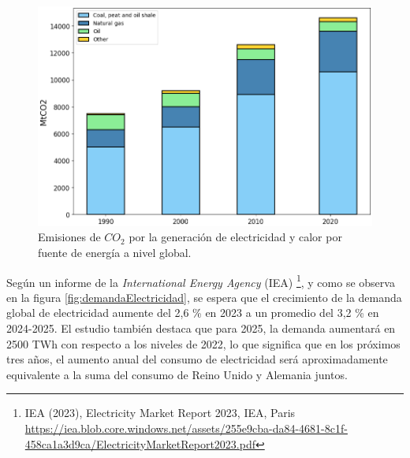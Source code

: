 \newpage

\begin{figure}[ht]
	\centering
	\includegraphics[width=1\textwidth]{./Figures/co2_emissions.png}
	\caption[Emisiones de $CO_2$ por la generación de electricidad.]{Emisiones de $CO_2$ por la generación de electricidad y calor por fuente de energía a nivel global\footnotemark.}
	\label{fig:emisionesco2}
	
\end{figure}


Según un informe de la \textit{International Energy Agency} (IEA) \footnote{IEA (2023), Electricity Market Report 2023, IEA, Paris \url{https://iea.blob.core.windows.net/assets/255e9cba-da84-4681-8c1f-458ca1a3d9ca/ElectricityMarketReport2023.pdf}}, y como se observa en la figura \ref{fig:demandaElectricidad}, se espera que el crecimiento de la demanda global de electricidad aumente del 2,6 \% en 2023 a un promedio del 3,2 \% en 2024-2025. El estudio también destaca que para 2025, la demanda aumentará en 2500 TWh con respecto a los niveles de 2022, lo que significa que en los próximos tres años, el aumento anual del consumo de electricidad será aproximadamente equivalente a la suma del consumo de Reino Unido y Alemania juntos.

\newpage

